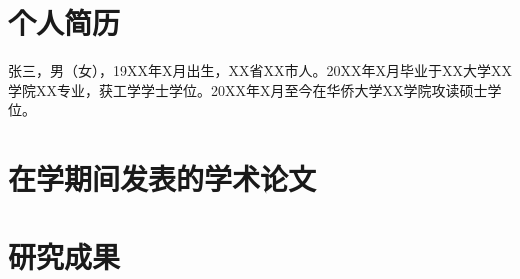 
\begin{resume}

\section*{个人简历}

张三，男（女），19XX年X月出生，XX省XX市人。20XX年X月毕业于XX大学XX学院XX专业，获工学学士学位。20XX年X月至今在华侨大学XX学院攻读硕士学位。

\section*{在学期间发表的学术论文}


\section*{研究成果}


\end{resume}
